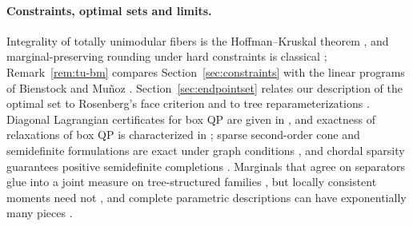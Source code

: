 \paragraph{Constraints, optimal sets and limits.}
Integrality of totally unimodular fibers is the Hoffman--Kruskal theorem
\cite{HoffmanKruskal1956,Schrijver1986}, and marginal-preserving rounding
under hard constraints is classical
\cite{GandhiEtAl2006,ChekuriVondrakZenklusen2010}; Remark~\ref{rem:tu-bm}
compares Section~\ref{sec:constraints} with the linear programs of Bienstock
and Mu\~noz \cite{BienstockMunoz2018}. Section~\ref{sec:endpointset} relates
our description of the optimal set to Rosenberg's face criterion and to tree
reparameterizations
\cite{Rosenberg1972,WainwrightJaakkolaWillsky2005,Werner2007}. Diagonal
Lagrangian certificates for box QP are given in
\cite{BeckTeboulle2000,JeyakumarRubinovWu2006,LiWuQuan2015}, and exactness
of relaxations of box QP is characterized in \cite{QiuYildirim2024}; sparse
second-order cone and semidefinite formulations are exact under graph
conditions \cite{SojoudiLavaei2014,DeyKhajavirad2026,Khajavirad2026SparseSDP},
and chordal sparsity guarantees positive semidefinite completions
\cite{GroneEtAl1984,VandenbergheAndersen2015}. Marginals that agree on
separators glue into a joint measure on tree-structured families
\cite{Vorobev1962,WainwrightJordan2008}, but locally consistent moments need
not \cite{SheraliAdams1990,WainwrightJordan2008}, and complete parametric
descriptions can have exponentially many pieces
\cite{Murty1980,MairalYu2012,GartnerJaggiMaria2012}.
